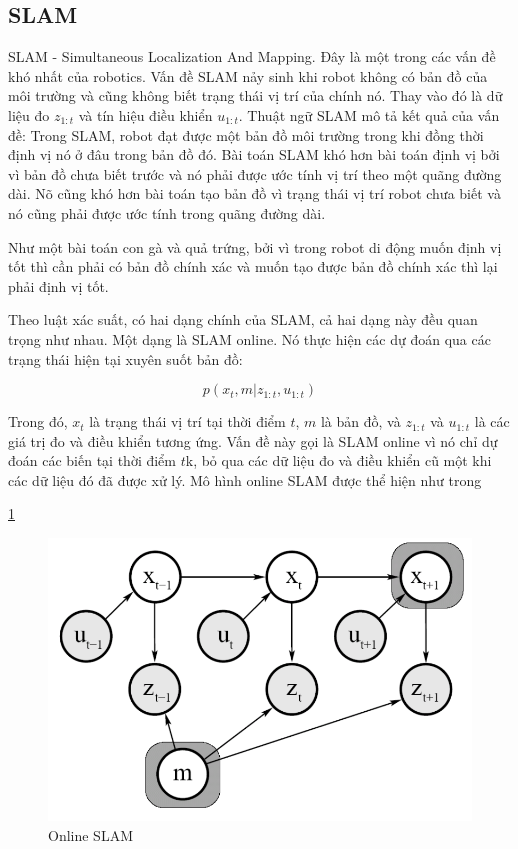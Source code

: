 {\subsection{SLAM}

SLAM - Simultaneous Localization And Mapping. Đây là một trong các vấn đề khó nhất của robotics. Vấn đề SLAM nảy sinh khi robot không có bản đồ của môi trường và cũng không biết trạng thái vị trí của chính nó. Thay vào đó là dữ liệu đo ${z}_{1:t}$ và tín hiệu điều khiển ${u}_{1:t}$. Thuật ngữ SLAM mô tả kết quả của vấn đề: Trong SLAM, robot đạt được một bản đồ môi trường trong khi đồng thời định vị nó ở đâu trong bản đồ đó. Bài toán SLAM khó hơn bài toán định vị bởi vì bản đồ chưa biết trước và nó phải được ước tính vị trí theo một quãng đường dài. Nõ cũng khó hơn bài toán tạo bản đồ vì trạng thái vị trí robot chưa biết và nó cũng phải được ước tính trong quãng đường dài.

Như một bài toán con gà và quả trứng, bởi vì trong robot di động muốn định vị tốt thì cần phải có bản đồ chính xác và muốn tạo được bản đồ chính xác thì lại phải định vị tốt.

Theo luật xác suất, có hai dạng chính của SLAM, cả hai dạng này đều quan trọng như nhau. Một dạng là SLAM online. Nó thực hiện các dự đoán qua các trạng thái hiện tại xuyên suốt bản đồ:

\begin{equation}
  p\left({x}_{t}, m | {z}_{1:t}, {u}_{1:t}\right)
\end{equation}

Trong đó, ${x}_{t}$ là trạng thái vị trí tại thời điểm $t$, $m$ là bản đồ, và ${z}_{1:t}$ và ${u}_{1:t}$ là các giá trị đo và điều khiển tương ứng. Vấn đề này gọi là SLAM online vì nó chỉ dự đoán các biến tại thời điểm $t$k, bỏ qua các dữ liệu đo và điều khiển cũ một khi các dữ liệu đó đã được xử lý. Mô hình online SLAM được thể hiện như trong \figurename{\ref{fig:onlineSLAM}

\begin{figure}[htbp]
  \centering
  \includegraphics[width=0.6\linewidth]{figures/onlineSLAM.PNG}
  \caption{Online SLAM}
  \label{fig:onlineSLAM}
\end{figure}

}}

